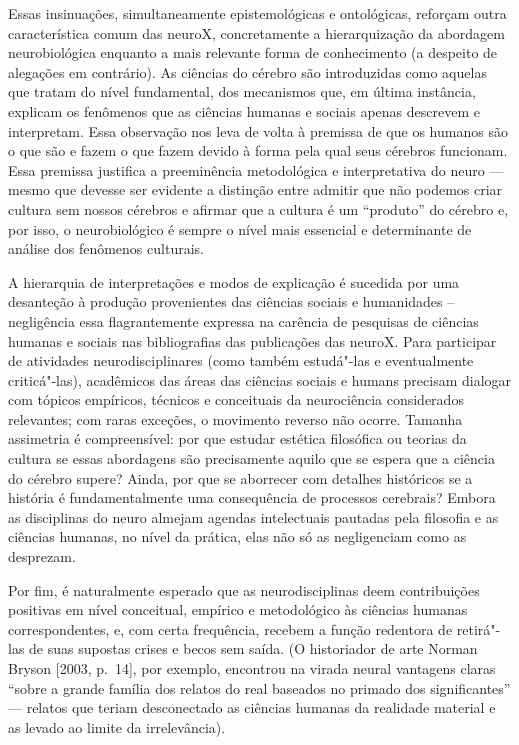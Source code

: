 Essas insinuações, simultaneamente epistemológicas e ontológicas,
reforçam outra característica comum das neuroX, concretamente a
hierarquização da abordagem neurobiológica enquanto a mais relevante
forma de conhecimento (a despeito de alegações em contrário). As
ciências do cérebro são introduzidas como aquelas que tratam do nível
fundamental, dos mecanismos que, em última instância, explicam os
fenômenos que as ciências humanas e sociais apenas descrevem e
interpretam. Essa observação nos leva de volta à premissa de que os
humanos são o que são e fazem o que fazem devido à forma pela qual seus
cérebros funcionam. Essa premissa justifica a preeminência metodológica
e interpretativa do neuro --- mesmo que devesse ser evidente a distinção
entre admitir que não podemos criar cultura sem nossos cérebros e
afirmar que a cultura é um ``produto'' do cérebro e, por isso, o
neurobiológico é sempre o nível mais essencial e determinante de análise
dos fenômenos culturais.

A hierarquia de interpretações e modos de explicação é sucedida por uma
desanteção à produção provenientes das ciências sociais e humanidades --
negligência essa flagrantemente expressa na carência de pesquisas de
ciências humanas e sociais nas bibliografias das publicações das neuroX.
Para participar de atividades neurodisciplinares (como também estudá"-las
e eventualmente criticá"-las), acadêmicos das áreas das ciências sociais
e humans precisam dialogar com tópicos empíricos, técnicos e conceituais
da neurociência considerados relevantes; com raras exceções, o movimento
reverso não ocorre. Tamanha assimetria é compreensível: por que estudar
estética filosófica ou teorias da cultura se essas abordagens são
precisamente aquilo que se espera que a ciência do cérebro supere?
Ainda, por que se aborrecer com detalhes históricos se a história é
fundamentalmente uma consequência de processos cerebrais? Embora as
disciplinas do neuro almejam agendas intelectuais pautadas pela
filosofia e as ciências humanas, no nível da prática, elas não só as
negligenciam como as desprezam.

Por fim, é naturalmente esperado que as neurodisciplinas deem
contribuições positivas em nível conceitual, empírico e metodológico às
ciências humanas correspondentes, e, com certa frequência, recebem a
função redentora de retirá"-las de suas supostas crises e becos sem
saída. (O historiador de arte Norman Bryson {[}2003, p.~14{]}, por
exemplo, encontrou na virada neural vantagens claras ``sobre a grande
família dos relatos do real baseados no primado dos significantes'' ---
relatos que teriam desconectado as ciências humanas da realidade
material e as levado ao limite da irrelevância).

